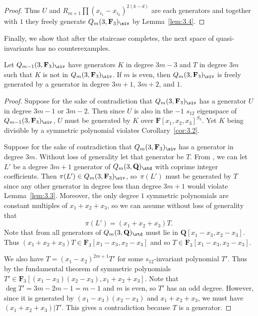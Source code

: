 \begin{proof}
 Thus $U$ and $R_{m+1}\prod (x_{i_1}-x_{i_2})^{2(k-d)}$ are each generators and together with $1$ they freely generate $Q_m(3,\mathbf{F}_3)_{\siv}$ by Lemma~\ref{lem:3.4}.
\end{proof}

Finally, we show that after the staircase completes, the next space of quasi-invariants has no counterexamples.

\begin{Lemma}\label{backNon}
 Let $Q_{m-1}(3,\mathbf{F}_3)_{\siv}$ have generators $K$ in degree $3m-3$ and $T$ in degree $3m$ such that $K$ is not in $Q_{m}(3,\mathbf{F}_3)_{\siv}$. If $m$ is even, then $Q_{m}(3,\mathbf{F}_3)_{\siv}$ is freely generated by a generator in degree $3m+1$, $3m+2$, and $1$.
\end{Lemma}
\begin{proof}
 Suppose for the sake of contradiction that $Q_{m}(3,\mathbf{F}_3)_{\siv}$ has a generator $U$ in degree $3m-1$ or $3m-2$. Then since $U$ is also in the $-1$ $s_{12}$ eigenspace of $Q_{m-1}(3,\mathbf{F}_3)_{\siv}$, $U$ must be generated by $K$ over $\mathbf{F}[x_1,x_2,x_3]^{S_3}$. Yet $K$ being divisible by a symmetric polynomial violates Corollary~\ref{cor:3.2}.

 Suppose for the sake of contradiction that $Q_{m}(3,\mathbf{F}_3)_{\siv}$ has a generator in degree $3m$. Without loss of generality let that generator be $T$. From \cite{felder2001action}, we can let $L'$ be a degree $3m+1$ generator of $Q_m(3,\mathbf{Q})_{\std}$ with coprime integer coefficients. Then $\pi(L')\in Q_m(3,\mathbf{F}_3)_{\siv}$, so~$\pi(L')$ must be generated by $T$ since any other generator in degree less than degree $3m+1$ would violate Lemma~\ref{lem:3.3}. Moreover, the only degree $1$ symmetric polynomials are constant multiples of $x_1+x_2+x_3$, so we can assume without loss of generality that
 \[\pi(L')=(x_1+x_2+x_3)T.\]
 Note that from \cite{wang2022explicit} all generators of $Q_m(3,\mathbf{Q})_{\std}$ must lie in $\mathbf{Q}[x_1-x_3,x_2-x_3]$. Thus $(x_1+x_2+x_3)T\in\mathbf{F}_3[x_1-x_3,x_2-x_3]$ and so $T\in \mathbf{F}_3[x_1-x_3,x_2-x_3]$.

 We also have $T=(x_1-x_2)^{2m+1}T'$ for some $s_{12}$-invariant polynomial $T'$. Thus by the fundamental theorem of symmetric polynomials $T'\in \mathbf{F}_3[(x_1-x_3)(x_2-x_3),x_1+x_2+x_3]$. Note that $\deg T' = 3m-2m-1=m-1$ and $m$ is even, so $T'$ has an odd degree. However, since it is generated by $(x_1-x_3)(x_2-x_3)$ and $x_1+x_2+x_3$, we must have $(x_1+x_2+x_3)|T'$. This gives a contradiction because $T$ is a generator.
\end{proof}


